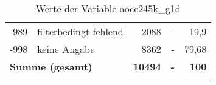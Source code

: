 \begin{longtable}{Xlrrr}
       -989 & filterbedingt fehlend & 2088 & - & 19,9 \\

       -998 & keine Angabe & 8362 & - & 79,68 \\

     \midrule
     \multicolumn{2}{l}{\textbf{Summe (gesamt)}} & \textbf{10494} & \textbf{-} & \textbf{100} \\
     \bottomrule
     \caption{Werte der Variable aocc245k\_g1d}
     \end{longtable}
     
